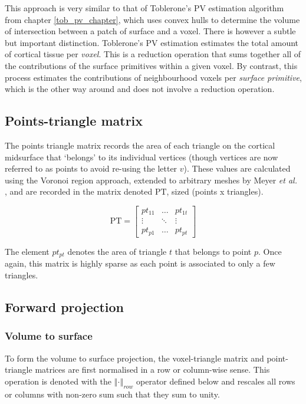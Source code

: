 \documentclass[12pt]{report}
\newcommand{\mat}[1]{\mathrm{#1}}
\begin{document}
This approach is very similar to that of Toblerone's PV estimation algorithm from chapter \ref{tob_pv_chapter}, which uses convex hulls to determine the volume of intersection between a patch of surface and a voxel. There is however a subtle but important distinction. Toblerone's PV estimation estimates the total amount of cortical tissue per \textit{voxel}. This is a reduction operation that sums together all of the contributions of the surface primitives within a given voxel. By contrast, this process estimates the contributions of neighbourhood voxels per \textit{surface primitive}, which is the other way around and does not involve a reduction operation. 

\subsection{Points-triangle matrix}
The points triangle matrix records the area of each triangle on the cortical midsurface that `belongs' to its individual vertices (though vertices are now referred to as points to avoid re-using the letter $v$). These values are calculated using the Voronoi region approach, extended to arbitrary meshes by Meyer \textit{et al.} \cite{Meyer2003}, and are recorded in the matrix denoted $\mat{PT}$, sized (points x triangles). 

\begin{equation}
\mat{PT} = 
\begin{bmatrix}
pt_{11} & \ldots & pt_{1t} \\
\vdots & \ddots & \vdots \\
pt_{p1} & \ldots & pt_{pt}
\end{bmatrix}
\end{equation}

The element $pt_{pt}$ denotes the area of triangle $t$ that belongs to point $p$. Once again, this matrix is highly sparse as each point is associated to only a few triangles. 

\subsection{Forward projection}

\subsubsection{Volume to surface}
To form the volume to surface projection, the voxel-triangle matrix and point-triangle matrices are first normalised in a row or column-wise sense. This operation is denoted with the $\left\Vert \cdot \right\Vert_{row}$ operator defined below and rescales all rows or columns with non-zero sum such that they sum to unity. 
\end{document}
